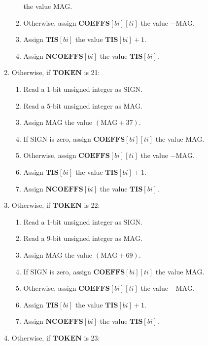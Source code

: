 \documentclass[9pt,letterpaper]{book}
\newcommand{\idx}[1]{{\ensuremath{\mathit{#1}}}}
\newcommand{\bi}{\idx{bi}}
\newcommand{\ti}{\idx{ti}}
\newcommand{\bitvar}[1]{\ensuremath{\mathbf{\bm{#1}}}}
\newcommand{\locvar}[1]{\ensuremath{\mathrm{#1}}}
\numberwithin{equation}{chapter}
\numberwithin{figure}{chapter}
\numberwithin{table}{chapter}
\begin{document}
\begin{enumerate}
\begin{enumerate}
 the value $\locvar{MAG}$.
\item
Otherwise, assign $\bitvar{COEFFS}[\bitvar{\bi}][\bitvar{\ti}]$ the value
 $-\locvar{MAG}$.
\item
Assign $\bitvar{TIS}[\bitvar{\bi}]$ the value $\bitvar{TIS}[\bitvar{\bi}]+1$.
\item
Assign $\bitvar{NCOEFFS}[\bitvar{\bi}]$ the value $\bitvar{TIS}[\bitvar{\bi}]$.
\end{enumerate}
\item
Otherwise, if \bitvar{TOKEN} is 21:
\begin{enumerate}
\item
Read a 1-bit unsigned integer as \locvar{SIGN}.
\item
Read a 5-bit unsigned integer as \locvar{MAG}.
\item
Assign \locvar{MAG} the value $(\locvar{MAG}+37)$.
\item
If \locvar{SIGN} is zero, assign $\bitvar{COEFFS}[\bitvar{\bi}][\bitvar{\ti}]$
 the value $\locvar{MAG}$.
\item
Otherwise, assign $\bitvar{COEFFS}[\bitvar{\bi}][\bitvar{\ti}]$ the value
 $-\locvar{MAG}$.
\item
Assign $\bitvar{TIS}[\bitvar{\bi}]$ the value $\bitvar{TIS}[\bitvar{\bi}]+1$.
\item
Assign $\bitvar{NCOEFFS}[\bitvar{\bi}]$ the value $\bitvar{TIS}[\bitvar{\bi}]$.
\end{enumerate}
\item
Otherwise, if \bitvar{TOKEN} is 22:
\begin{enumerate}
\item
Read a 1-bit unsigned integer as \locvar{SIGN}.
\item
Read a 9-bit unsigned integer as \locvar{MAG}.
\item
Assign \locvar{MAG} the value $(\locvar{MAG}+69)$.
\item
If \locvar{SIGN} is zero, assign $\bitvar{COEFFS}[\bitvar{\bi}][\bitvar{\ti}]$
 the value $\locvar{MAG}$.
\item
Otherwise, assign $\bitvar{COEFFS}[\bitvar{\bi}][\bitvar{\ti}]$ the value
 $-\locvar{MAG}$.
\item
Assign $\bitvar{TIS}[\bitvar{\bi}]$ the value $\bitvar{TIS}[\bitvar{\bi}]+1$.
\item
Assign $\bitvar{NCOEFFS}[\bitvar{\bi}]$ the value $\bitvar{TIS}[\bitvar{\bi}]$.
\end{enumerate}
\item
Otherwise, if \bitvar{TOKEN} is 23:
\begin{enumerate}

\end{enumerate}
\end{enumerate}
\end{document}
